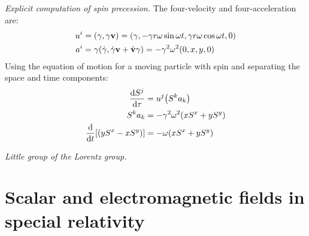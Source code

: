 \documentclass{report}
\begin{document}
\begin{subquests}
	\item \emph{Explicit computation of spin precession.}
	The four-velocity and four-acceleration are:
	\begin{align*}
		u^i & = \pqty{\gamma, \gamma \vb v} = \pqty{\gamma, -\gamma r\omega\sin\omega t, \gamma r\omega\cos\omega t, 0} \\
		a^i & = \gamma\pqty{\dot{\gamma}, \dot{\gamma}\vb v + \dot{\vb v}\gamma} = -\gamma^2 \omega^2\pqty{0,x,y,0}
	\end{align*}
	Using the equation of motion for a moving particle with spin and separating the space and time components:
	\begin{align*}
		\dv{S^j}{\tau} & = u^j \pqty{S^k a_k} \\
		S^k a_k & = -\gamma^2 \omega^2 \pqty{xS^x + yS^y} \\
		\dv{t}\bqty{\pqty{yS^x - xS^y}} & = -\omega\pqty{xS^x + yS^y}
	\end{align*}

	\item \emph{Little group of the Lorentz group.}
\end{subquests}


\chapter{Scalar and electromagnetic fields in special relativity}
\end{document}
